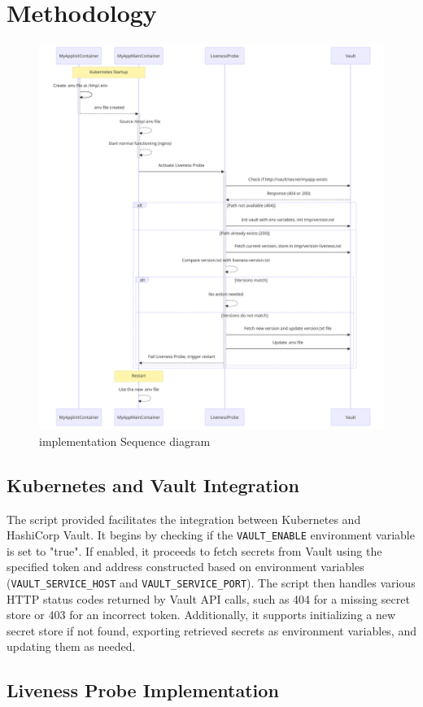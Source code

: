 \section{Methodology}

\begin{figure}[h]
    \centering
    \includegraphics[width=0.8\linewidth]{figures/seq.png}
    \caption{implementation Sequence diagram}
    \label{fig:Sequence diagram}
\end{figure}

\subsection{Kubernetes and Vault Integration}

The script provided facilitates the integration between Kubernetes and HashiCorp Vault. It begins by checking if the \texttt{VAULT\_ENABLE} environment variable is set to "true". If enabled, it proceeds to fetch secrets from Vault using the specified token and address constructed based on environment variables (\texttt{VAULT\_SERVICE\_HOST} and \texttt{VAULT\_SERVICE\_PORT}). The script then handles various HTTP status codes returned by Vault API calls, such as 404 for a missing secret store or 403 for an incorrect token. Additionally, it supports initializing a new secret store if not found, exporting retrieved secrets as environment variables, and updating them as needed.

\subsection{Liveness Probe Implementation}

